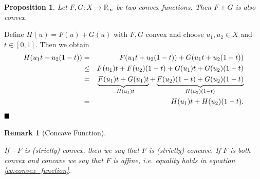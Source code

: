 \documentclass{scrreprt}
\newcommand{\qed}{$\hfill\blacksquare$}
\newtheorem{proposition}[theorem]{Proposition}
\newtheorem{remark}[theorem]{Remark}
\newenvironment{proof}[1][Proof]{\begin{trivlist}
\item[\hskip \labelsep {\bfseries #1}]}{\end{trivlist}}
\begin{document}
        \begin{proposition} %
            Let $F, G: X \longrightarrow \mathbb{R}_{\infty}$ be two convex functions. Then $F + G$ is also convex.
        \end{proposition}

        \begin{proof} %
            Define $H(u) = F(u) + G(u)$ with $F, G$ convex and choose $u_{1}, u_{2} \in X$ and $t \in [0, 1]$. Then we obtain
            \begin{eqnarray}
                H(u_{1}t + u_{2}(1 - t)) &=& F(u_{1}t + u_{2}(1 - t)) + G(u_{1}t + u_{2}(1 - t)) \notag \\ 
                &\le& F(u_{1})t + F(u_{2})(1 - t) + G(u_{1})t + G(u_{2})(1 - t) \notag \\
                &=& \underbrace{F(u_{1})t + G(u_{1})t}_{= H(u_{1})t} + \underbrace{F(u_{2})(1 - t) + G(u_{2})(1 - t)}_{H(u_{2})(1 - t)} \notag \\
                &=& H(u_{1})t + H(u_{2})(1 - t). \notag
            \end{eqnarray}\qed
        \end{proof}

        \begin{remark}[Concave Function] %
            \label{rem:concave_function}

            If $-F$ is (strictly) convex, then we say that $F$ is (strictly) concave. If $F$ is both convex and concave we say that $F$ is affine, i.e. equality holds in equation \ref{eq:convex_function}.

        \end{remark}
\end{document}
